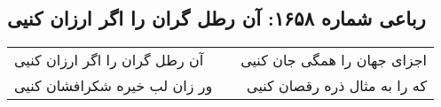 \begin{center}
\section*{رباعی شماره ۱۶۵۸: آن رطل گران را اگر ارزان کنیی}
\label{sec:1658}
\begin{longtable}{l p{0.5cm} r}
آن رطل گران را اگر ارزان کنیی
&&
اجزای جهان را همگی جان کنیی
\\
ور زان لب خیره شکرافشان کنیی
&&
که را به مثال ذره رقصان کنیی
\\
\end{longtable}
\end{center}
